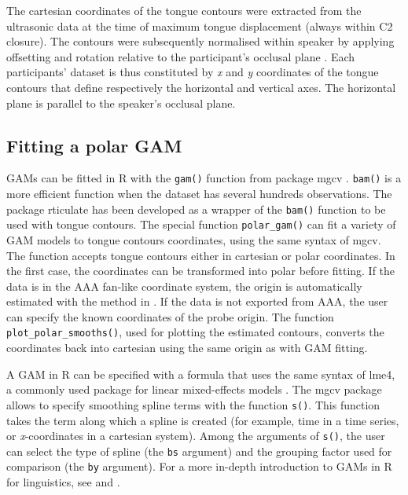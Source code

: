 \documentclass[11pt,]{article}
\begin{document}
The cartesian coordinates of the tongue contours were extracted from the
ultrasonic data at the time of maximum tongue displacement (always
within C2 closure). The contours were subsequently normalised within
speaker by applying offsetting and rotation relative to the
participant's occlusal plane \citep{scobbie2011}. Each participants'
dataset is thus constituted by \emph{x} and \emph{y} coordinates of the
tongue contours that define respectively the horizontal and vertical
axes. The horizontal plane is parallel to the speaker's occlusal plane.

\hypertarget{fitting-a-polar-gam}{%
\subsection{Fitting a polar GAM}\label{fitting-a-polar-gam}}

GAMs can be fitted in R with the \texttt{gam()} function from package
mgcv \citep{wood2011, wood2017}. \texttt{bam()} is a more efficient
function when the dataset has several hundreds observations. The package
rticulate has been developed as a wrapper of the \texttt{bam()} function
to be used with tongue contours. The special function
\texttt{polar\_gam()} can fit a variety of GAM models to tongue contours
coordinates, using the same syntax of mgcv. The function accepts tongue
contours either in cartesian or polar coordinates. In the first case,
the coordinates can be transformed into polar before fitting. If the
data is in the AAA fan-like coordinate system, the origin is
automatically estimated with the method in \citet{heyne2015a}. If the
data is not exported from AAA, the user can specify the known
coordinates of the probe origin. The function
\texttt{plot\_polar\_smooths()}, used for plotting the estimated
contours, converts the coordinates back into cartesian using the same
origin as with GAM fitting.

A GAM in R can be specified with a formula that uses the same syntax of
lme4, a commonly used package for linear mixed-effects models
\citep{bates2015}. The mgcv package allows to specify smoothing spline
terms with the function \texttt{s()}. This function takes the term along
which a spline is created (for example, time in a time series, or
\emph{x}-coordinates in a cartesian system). Among the arguments of
\texttt{s()}, the user can select the type of spline (the \texttt{bs}
argument) and the grouping factor used for comparison (the \texttt{by}
argument). For a more in-depth introduction to GAMs in R for
linguistics, see \citet{soskuthy2017} and \citet{wieling2017}.
\end{document}
